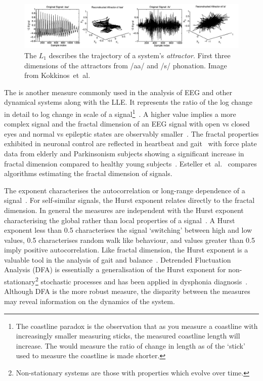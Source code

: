 \documentclass[12pt, twoside]{book}
\renewcommand\emph[1]{\textit{\color{USred}{#1}}}
\begin{document}
\begin{figure}[h]
	\label{spectrogram}
	\centering\centerline{\includegraphics[width=1.2\linewidth]{attractor.png}}
	\caption{The $L_1$ describes the trajectory of a system's \textit{attractor}. First three dimensions of the attractors from /aa/ and /s/ phonation. Image from Kokkinos~et~al.~\cite{kokkinos2005nonlinearlyapunov} }
\end{figure}




The \emph{fractal dimension} is another measure commonly used in the analysis of EEG and other dynamical systems along with the LLE. It represents the ratio of the log change in detail to log change in scale of a signal\footnote{The coastline paradox is the observation that as you measure a coastline with increasingly smaller measuring sticks, the measured coastline length will increase. The \emph{fractal dimension} would measure the ratio of change in length as of the `stick' used to measure the coastline is made shorter.}~\cite{mandelbrot1967long}. A higher value implies a more complex signal and the fractal dimension of an EEG signal with open vs closed eyes and normal vs epileptic states are observably smaller~\cite{eegfractal, seizuredimensions}. The fractal properties exhibited in neuronal control are reflected in heartbeat and gait~\cite{fractalgait} with force plate data from elderly and Parkinsonism subjects showing a significant increase in fractal dimension compared to healthy young subjects~\cite{hfdcop, fractalpd, fractalbalance}. Esteller et~al.~\cite{fractaldimensions} compares algorithms estimating the fractal dimension of signals.

The \emph{Hurst} exponent characterises the autocorrelation or long-range dependence of a signal~\cite{hurst1965long}. For self-similar signals, the Hurst exponent relates directly to the fractal dimension. In general the measures are independent with the Hurst exponent characterising the global rather than local properties of a signal~\cite{hurstfractal}. A Hurst exponent less than 0.5 characterises the signal `switching' between high and low values, 0.5 characterises random walk like behaviour, and values greater than 0.5 imply positive autocorrelation. Like fractal dimension, the Hurst exponent is a valuable tool in the analysis of gait and balance~\cite{duarte2000fractal}. Detrended Fluctuation Analysis (DFA) is essentially a generalisation of the Hurst exponent for non-stationary\footnote{Non-stationary systems are those with properties which evolve over time.} stochastic processes and has been applied in dysphonia diagnosis~\cite{splittlenonlinear2007}. Although DFA is the more robust measure, the disparity between the measures may reveal information on the dynamics of the system.
\end{document}
